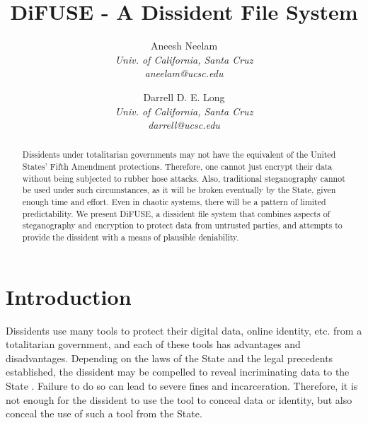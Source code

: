 \documentclass[10pt,twocolumn]{article}
\begin{document}
\title{DiFUSE - A Dissident File System}

\author{
Aneesh Neelam \\
\textit{Univ. of California, Santa Cruz} \\
\textit{aneelam@ucsc.edu}
\and
Darrell D. E. Long \\
\textit{Univ. of California, Santa Cruz} \\
\textit{darrell@ucsc.edu}
}

\maketitle

\begin{abstract}

Dissidents under totalitarian governments may not have the equivalent of the United States' Fifth Amendment protections. Therefore, one cannot just encrypt their data without being subjected to rubber hose attacks. Also, traditional steganography cannot be used under such circumstances, as it will be broken eventually by the State, given enough time and effort. Even in chaotic systems, there will be a pattern of limited predictability.  We present DiFUSE, a dissident file system that combines aspects of steganography and encryption to protect data from untrusted parties, and attempts to provide the dissident with a means of plausible deniability.

\end{abstract}

\section{Introduction}

Dissidents use many tools to protect their digital data, online identity, etc. from a totalitarian government, and each of these tools has advantages and disadvantages. Depending on the laws of the State and the legal precedents established, the dissident may be compelled to reveal incriminating data to the State \cite{gametheory}. Failure to do so can lead to severe fines and incarceration.  Therefore, it is not enough for the dissident to use the tool to conceal data or identity, but also conceal the use of such a tool from the State.
\end{document}
